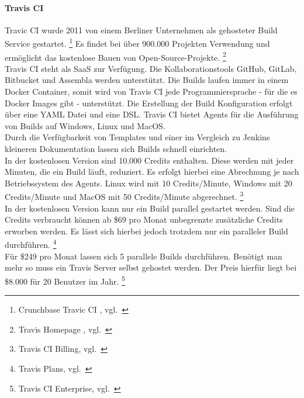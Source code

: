 \paragraph{Travis CI}\label{ci_services_tools_travis}

Travic CI wurde 2011 von einem Berliner Unternehmen als gehosteter Build Service gestartet. \footnote{Crunchbase Travic CI , vgl.~\cite{CRUNCHBASE_TRAVIS_CI}}
Es findet bei über 900.000 Projekten Verwendung und ermöglicht das kostenlose Bauen von Open-Source-Projekte. \footnote{Travis Homepage , vgl.~\cite{TRAVIS_HOMEPAGE}} \\

Travis CI steht als SaaS zur Verfügung.
Die Kollaborationstools GitHub, GitLab, Bitbucket und Assembla werden unterstützt.
Die Builds laufen immer in einem Docker Container, somit wird von Travis CI jede Programmiersprache - für die es Docker Images gibt - unterstützt.
Die Erstellung der Build Konfiguration erfolgt über eine YAML Datei und eine DSL.
Travis CI bietet Agents für die Ausführung von Builds auf Windows, Linux und MacOS. \\

Durch die Verfügbarkeit von Templates und einer im Vergleich zu Jenkins kleineren Dokumentation lassen sich
Builds schnell einrichten. \\

In der kostenlosen Version sind 10.000 Credits enthalten.
Diese werden mit jeder Minuten, die ein Build läuft, reduziert.
Es erfolgt hierbei eine Abrechnung je nach Betriebssystem des Agents.
Linux wird mit 10 Credits/Minute, Windows mit 20 Credits/Minute und MacOS mit 50 Credits/Minute abgerechnet. \footnote{Travis CI Billing, vgl.~\cite{TRAVIS_BILLING}} \\

In der kostenlosen Version kann nur ein Build parallel gestartet werden.
Sind die Credits verbraucht können ab \$69 pro Monat unbegrenzte zusätzliche Credits erworben werden.
Es lässt sich hierbei jedoch trotzdem nur ein paralleler Build durchführen. \footnote{Travis Plans, vgl.~\cite{TRAVIS_PLANS}} \\

Für \$249 pro Monat lassen sich 5 parallele Builds durchführen.
Benötigt man mehr so muss ein Travis Server selbst gehostet werden.
Der Preis hierfür liegt bei \$8.000 für 20 Benutzer im Jahr. \footnote{Travis CI Enterprise, vgl.~\cite{TRAVIS_ENTERPRISE}}




